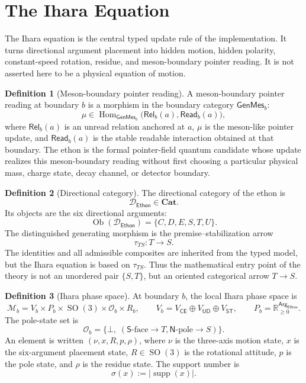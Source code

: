 \documentclass[11pt]{article}
\theoremstyle{definition}
\newtheorem{definition}{Definition}[section]
\theoremstyle{plain}
\newcommand{\Eth}{\mathsf{Ethon}}
\newcommand{\CE}{\mathsf{CE}}
\newcommand{\UD}{\mathsf{UD}}
\newcommand{\ST}{\mathsf{ST}}
\newcommand{\Arg}{\mathsf{Arg}}
\newcommand{\Npole}{\mathsf N}
\newcommand{\Spole}{\mathsf S}
\newcommand{\Rel}{\mathsf{Rel}}
\newcommand{\Read}{\mathsf{Read}}
\newcommand{\GenMes}{\mathsf{GenMes}}
\newcommand{\Dir}{\mathcal D}
\newcommand{\Cat}{\mathbf{Cat}}
\newcommand{\defeq}{\mathrel{:=}}
\DeclareMathOperator{\supp}{supp}
\DeclareMathOperator{\Hom}{Hom}
\DeclareMathOperator{\SO}{SO}
\begin{document}
\section{The Ihara Equation}

The Ihara equation is the central typed update rule of the implementation.
It turns directional argument placement into hidden motion, hidden
polarity, constant-speed rotation, residue, and meson-boundary pointer
reading.  It is not asserted here to be a physical equation of motion.

\begin{definition}[Meson-boundary pointer reading]
A meson-boundary pointer reading at boundary \(b\) is a morphism in the
boundary
category \(\GenMes_b\):
\[
  \mu\in
  \Hom_{\GenMes_b}\bigl(\Rel_b(a),\Read_b(a)\bigr),
\]
where \(\Rel_b(a)\) is an unread relation anchored at \(a\), \(\mu\) is
the meson-like pointer update, and \(\Read_b(a)\) is the stable readable
interaction obtained at that boundary.  The ethon is the formal
pointer-field quantum candidate whose update realizes this
meson-boundary reading without first choosing a particular physical mass,
charge state, decay channel, or detector boundary.
\end{definition}

\begin{definition}[Directional category]
The directional category of the ethon is
\[
  \Dir_{\Eth}\in\Cat.
\]
Its objects are the six directional arguments:
\[
  \operatorname{Ob}(\Dir_{\Eth})
  =
  \{C,D,E,S,T,U\}.
\]
The distinguished generating morphism is the premise--stabilization arrow
\[
  \tau_{TS}:T\longrightarrow S.
\]
The identities and all admissible composites are inherited from the
typed model, but the Ihara equation is based on \(\tau_{TS}\).  Thus the
mathematical entry point of the theory is not an unordered pair
\(\{S,T\}\), but an oriented categorical arrow \(T\to S\).
\end{definition}

\begin{definition}[Ihara phase space]
At boundary \(b\), the local Ihara phase space is
\[
  \mathcal M_b
  =
  V_b\times P_b\times \SO(3)\times \mathcal O_b\times R_b,
  \qquad
  V_b=V_{\CE}\oplus V_{\UD}\oplus V_{\ST},
  \qquad
  P_b=\mathbb R_{\geq0}^{\Arg_{\Eth}}.
\]
The pole-state set is
\[
  \mathcal O_b
  =
  \{\bot,\;(\Spole\text{-face}\to T,\Npole\text{-pole}\to S)\}.
\]
An element is written \((\nu,x,R,p,\rho)\), where \(\nu\) is the
three-axis motion state, \(x\) is the six-argument placement state,
\(R\in\SO(3)\) is the rotational attitude, \(p\) is the pole state, and
\(\rho\) is the residue state.  The support number is
\[
  \sigma(x)\defeq|\supp(x)|.
\]
\end{definition}
\end{document}
